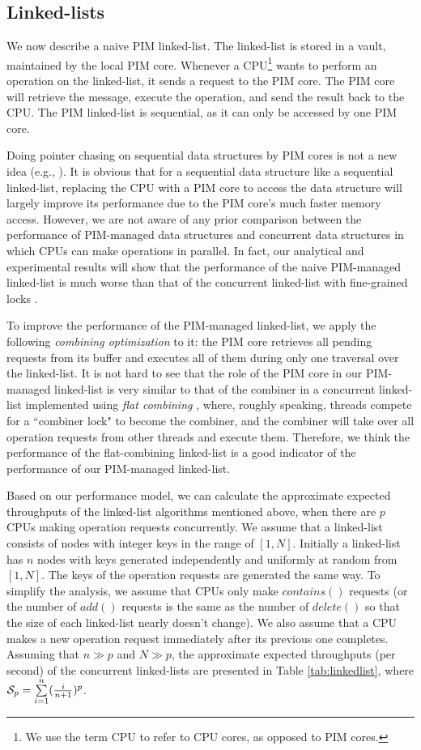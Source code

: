 \subsection{Linked-lists}
\label{section:linked_list}
We now describe a naive PIM linked-list.
The linked-list is stored in a vault, maintained by the local PIM core.
Whenever a CPU\footnote{We use the term CPU to refer to CPU cores, as opposed to PIM cores.} 
wants to perform an operation on the linked-list,
it sends a request to the PIM core.
The PIM core will retrieve the message, execute the operation, and send the result back to the CPU.
The PIM linked-list is sequential, as it can only be accessed by one PIM core. 

Doing pointer chasing on sequential data structures by PIM cores is not a new idea
(e.g., \cite{hsieh2016accelerating, Ahn2015:2}).
It is obvious that for a sequential data structure like a sequential linked-list,
replacing the CPU with a PIM core to access the data structure will largely improve
its performance due to the PIM core's much faster memory access.
However, we are not aware of any prior comparison between the performance of
PIM-managed data structures and concurrent data structures
in which CPUs can make operations in parallel.
In fact, our analytical and experimental results will show that
the performance of the naive PIM-managed linked-list is much worse than
that of the concurrent linked-list with fine-grained locks \cite{Heller05}.

To improve the performance of the PIM-managed linked-list,
we apply the following \textit{combining optimization} to it:
the PIM core retrieves all pending requests from its buffer and
executes all of them during only one traversal over the linked-list.
It is not hard to see that the role of the PIM core in our PIM-managed linked-list
is very similar to that of the combiner in a concurrent linked-list implemented
using \textit{flat combining} \cite{Hendler10}, where, roughly speaking,
threads compete for a ``combiner lock" to become the combiner, and
the combiner will take over all operation requests from other threads and execute them.
Therefore, we think the performance of the flat-combining linked-list is a good indicator 
of the performance of our PIM-managed linked-list.

Based on our performance model, we can calculate the approximate expected
throughputs of the linked-list algorithms mentioned above, 
when there are $p$ CPUs making operation requests concurrently.
We assume that a linked-list consists of nodes with integer keys in the range of $[1, N]$.
Initially a linked-list has $n$ nodes with keys generated independently
and uniformly at random from $[1, N]$.
The keys of the operation requests are generated the same way.
To simplify the analysis, we assume that CPUs only make $contains()$ requests
(or the number of $add()$ requests is the same as the number of $delete()$
so that the size of each linked-list nearly doesn't change).
We also assume that a CPU makes a new operation request immediately after
its previous one completes.
Assuming that $n \gg p$ and $N \gg p$, the approximate expected throughputs (per second) 
of the concurrent linked-lists are presented in Table \ref{tab:linkedlist}, 
where $\mathcal{S}_{p} = \sum\limits_{i=1}^{n} ({i \over n+1})^{p}$.

